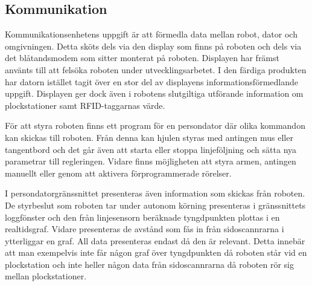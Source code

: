 

\subsection{Kommunikation}

Kommunikationsenhetens uppgift är att förmedla data mellan robot, dator och omgivningen. Detta sköts dels via den display som finns på roboten och dels via det blåtandsmodem som sitter monterat på roboten. Displayen har främst använts till att felsöka roboten under utvecklingsarbetet. I den färdiga produkten har datorn istället tagit över en stor del av displayens informationsförmedlande uppgift. Displayen ger dock även i robotens slutgiltiga utförande information om plockstationer samt RFID-taggarnas värde.

För att styra roboten finns ett program för en persondator där olika kommandon kan skickas till roboten. Från denna kan hjulen styras med antingen mus eller tangentbord och det går även att starta eller stoppa linjeföljning och sätta nya parametrar till regleringen. Vidare finns möjligheten att styra armen, antingen manuellt eller genom att aktivera förprogrammerade rörelser.

I persondatorgränssnittet presenteras även information som skickas från roboten. De styrbeslut som roboten tar under autonom körning presenteras i gränssnittets loggfönster och den från linjesensorn beräknade tyngdpunkten plottas i en realtidsgraf. Vidare presenteras de avstånd som fås in från sidoscannrarna i ytterliggar en graf. All data presenteras endast då den är relevant. Detta innebär att man exempelvis inte får någon graf över tyngdpunkten då roboten står vid en plockstation och inte heller någon data från sidoscannrarna då roboten rör sig mellan plockstationer.




